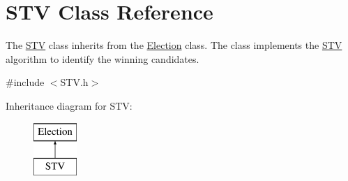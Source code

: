 \hypertarget{class_s_t_v}{}\section{S\+TV Class Reference}
\label{class_s_t_v}


The \hyperlink{class_s_t_v}{S\+TV} class inherits from the \hyperlink{class_election}{Election} class. The class implements the \hyperlink{class_s_t_v}{S\+TV} algorithm to identify the winning candidates.  




{\ttfamily \#include $<$S\+T\+V.\+h$>$}

Inheritance diagram for S\+TV\+:\begin{figure}[H]
\begin{center}
\leavevmode
\includegraphics[height=2.000000cm]{class_s_t_v}
\end{center}
\end{figure}
